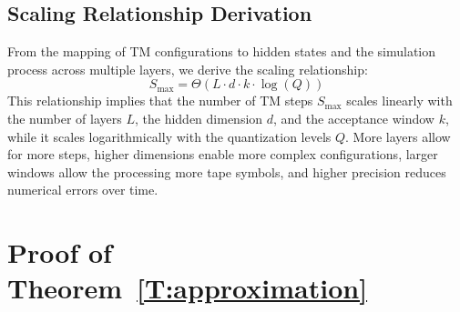 

\subsection{Scaling Relationship Derivation}

From the mapping of TM configurations to hidden states and the simulation process across multiple layers, we derive the scaling relationship:
\[
S_{\text{max}} = \Theta(L \cdot d \cdot k \cdot \log(Q))
\]
This relationship implies that the number of TM steps \( S_{\text{max}} \) scales linearly with the number of layers \( L \), the hidden dimension \( d \), and the acceptance window \( k \), while it scales logarithmically with the quantization levels \( Q \). More layers allow for more steps, higher dimensions enable more complex configurations, larger windows allow the processing more tape symbols, and higher precision reduces numerical errors over time.




\section{Proof of Theorem~\ref{T:approximation}}\label{appendix:theorem43}


